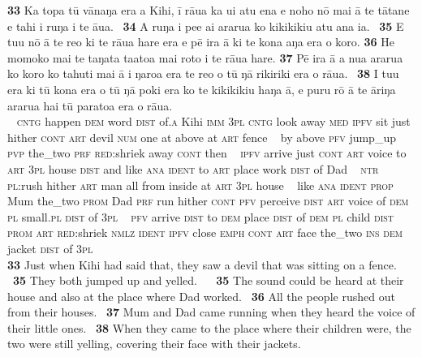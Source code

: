 {\bigskip\gll
\textbf{\textup{33}} Ka topa tū vānaŋa era {\ꞌ}a Kihi, {\ꞌ}ī rāua ka u{\ꞌ}i atu ena e noho nō mai {\ꞌ}ā te tātane e tahi {\ꞌ}i ruŋa i te {\ꞌ}āua. ~\textbf{\textup{34}} A ruŋa i pe{\ꞌ}e ai ararua ko kikikikiu atu {\ꞌ}ana ia. ~\textbf{\textup{35}} E tu{\ꞌ}u nō {\ꞌ}ā te re{\ꞌ}o ki te rāua hare era {\ꞌ}e pē ira {\ꞌ}ā ki te kona aŋa era o koro. \textbf{\textup{36}} He momoko mai te taŋata ta{\ꞌ}ato{\ꞌ}a mai roto i te rāua hare. \textbf{\textup{37}} Pē ira {\ꞌ}ā a nua ararua ko koro ko tahuti mai {\ꞌ}ā i ŋaro{\ꞌ}a era te re{\ꞌ}o o tū ŋā rikiriki era o rāua. ~\textbf{\textup{38}} I tu{\ꞌ}u era ki tū kona era o tū ŋā poki era ko te kikikikiu haŋa {\ꞌ}ā, e puru rō {\ꞌ}ā te {\ꞌ}āriŋa ararua hai tū paratoa era o rāua.\\
~ \textsc{cntg} happen \textsc{dem} word \textsc{dist} of\textsc{.a} Kihi \textsc{imm} \textsc{3pl} \textsc{cntg} look away \textsc{med} \textsc{ipfv} sit just hither \textsc{cont} \textsc{art} devil \textsc{num} one at above at \textsc{art} fence ~ by above \textsc{pfv} jump\_up \textsc{pvp} the\_two \textsc{prf} \textsc{red}:shriek away \textsc{cont} then ~ \textsc{ipfv} arrive just \textsc{cont} \textsc{art} voice to \textsc{art} \textsc{3pl} house \textsc{dist} and like \textsc{ana} \textsc{ident} to \textsc{art} place work \textsc{dist} of Dad  ~ \textsc{ntr} \textsc{pl}:rush hither \textsc{art} man all from inside at \textsc{art} \textsc{3pl} house  ~ like \textsc{ana} \textsc{ident} \textsc{prop} Mum the\_two \textsc{prom} Dad \textsc{prf} run hither \textsc{cont} \textsc{pfv} perceive \textsc{dist} \textsc{art} voice of \textsc{dem} \textsc{pl} small.\textsc{pl} \textsc{dist} of \textsc{3pl} ~ \textsc{pfv} arrive \textsc{dist} to \textsc{dem} place \textsc{dist} of \textsc{dem} \textsc{pl} child \textsc{dist} \textsc{prom} \textsc{art} \textsc{red}:shriek \textsc{nmlz} \textsc{ident} \textsc{ipfv} close \textsc{emph} \textsc{cont} \textsc{art} face the\_two \textsc{ins} \textsc{dem} jacket \textsc{dist} of \textsc{3pl}\\

\medskip\glt
\textbf{\textup{33}} Just when Kihi had said that, they saw a devil that was sitting on a fence. ~\textbf{\textup{35}} They both jumped up and yelled. ~ ~\textbf{\textup{35}} The sound could be heard at their house and also at the place where Dad worked. ~\textbf{\textup{36}} All the people rushed out from their houses. ~\textbf{\textup{37}} Mum and Dad came running when they heard the voice of their little ones. ~\textbf{\textup{38}} When they came to the place where their children were, the two were still yelling, covering their face with their jackets. 


}
